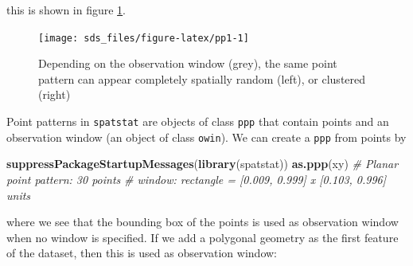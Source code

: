 \documentclass[]{book}
\newenvironment{Shaded}{\begin{snugshade}}{\end{snugshade}}
\newcommand{\CommentTok}[1]{\textcolor[rgb]{0.56,0.35,0.01}{\textit{#1}}}
\newcommand{\DataTypeTok}[1]{\textcolor[rgb]{0.13,0.29,0.53}{#1}}
\newcommand{\DecValTok}[1]{\textcolor[rgb]{0.00,0.00,0.81}{#1}}
\newcommand{\FloatTok}[1]{\textcolor[rgb]{0.00,0.00,0.81}{#1}}
\newcommand{\KeywordTok}[1]{\textcolor[rgb]{0.13,0.29,0.53}{\textbf{#1}}}
\newcommand{\NormalTok}[1]{#1}
\newcommand{\OperatorTok}[1]{\textcolor[rgb]{0.81,0.36,0.00}{\textbf{#1}}}
\newcommand{\StringTok}[1]{\textcolor[rgb]{0.31,0.60,0.02}{#1}}
\begin{document}
\begin{Shaded}
\end{Shaded}

this is shown in figure \ref{fig:pp1}.

\begin{figure}

{\centering \texttt{[image: sds\_files/figure-latex/pp1-1]} 

}

\caption{Depending on the observation window (grey), the same point pattern can appear completely spatially random (left), or clustered (right)}\label{fig:pp1}
\end{figure}

Point patterns in \texttt{spatstat} are objects of class \texttt{ppp} that contain
points and an observation window (an object of class \texttt{owin}).
We can create a \texttt{ppp} from points by

\begin{Shaded}
\begin{Highlighting}[]
\KeywordTok{suppressPackageStartupMessages}\NormalTok{(}\KeywordTok{library}\NormalTok{(spatstat))}
\KeywordTok{as.ppp}\NormalTok{(xy)}
\CommentTok{# Planar point pattern: 30 points}
\CommentTok{# window: rectangle = [0.009, 0.999] x [0.103, 0.996] units}
\end{Highlighting}
\end{Shaded}

where we see that the bounding box of the points is used as observation
window when no window is specified. If we add a polygonal geometry as the
first feature of the dataset, then this is used as observation window:
\end{document}
